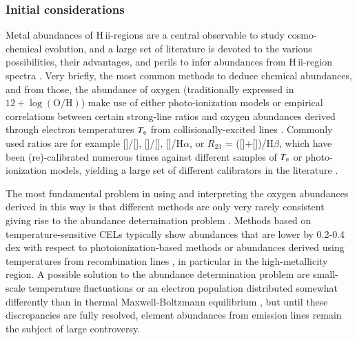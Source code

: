 \documentclass[traditabstract]{aa}
\newcommand{\hb}{H$\beta$}
\newcommand{\ha}{H$\alpha$}
\newcommand{\hii}{\mbox{H\,{\sc ii}}}
\newcommand{\oh}{12+\log(\mathrm{O/H})}
\newcommand{\oii}{[\ion{O}{ii}]}
\newcommand{\oiii}{[\ion{O}{iii}]}
\newcommand{\nii}{[\ion{N}{ii}]}
\begin{document}
\subsubsection{Initial considerations}

Metal abundances of \hii-regions are a central observable to study cosmo-chemical evolution, and a large set of literature is devoted to the various possibilities, their advantages, and perils to infer abundances from \hii-region spectra  \citep[e.g.][]{1979MNRAS.189...95P, 1991ApJ...380..140M, 2005ApJ...631..231P, 2008ApJ...681.1183K}. Very briefly, the most common methods to deduce chemical abundances, and from those, the abundance of oxygen (traditionally expressed in $\oh$) make use of either photo-ionization models \citep[e.g.][]{1985ApJS...58..125E, 2000ApJ...542..224D, 2002ApJS..142...35K} or empirical correlations between certain strong-line ratios and oxygen abundances derived through electron temperatures $T_{\rm{e}}$ from collisionally-excited lines \citep[CELs, e.g.][]{2004MNRAS.348L..59P, 2013A&A...559A.114M}. Commonly used ratios are for example \nii/\oii, \oiii/\nii, \nii/\ha, or $R_{23}$ = (\oii+\oiii)/\hb, which have been (re)-calibrated numerous times against different samples of $T_{\rm{e}}$ or photo-ionization models, yielding a large set of different calibrators in the literature \citep[e.g.][]{2002ApJS..142...35K, 2004ApJ...617..240K, 2005ApJ...631..231P, 2006A&A...459...85N, 2008A&A...488..463M}.

The most fundamental problem in using and interpreting the oxygen abundances derived in this way is that different methods are only very rarely consistent \citep[e.g.][]{2008ApJ...681.1183K} giving rise to the abundance determination problem \citep{1967ApJ...150..825P}. Methods based on temperature-sensitive CELs typically show abundances that are lower by 0.2-0.4 dex with respect to photoionization-based methods or abundances derived using temperatures from recombination lines \citep[e.g.][and references therein]{2012MNRAS.426.2630L}, in particular in the high-metallicity region. A possible solution to the abundance determination problem are small-scale temperature fluctuations \citep[e.g.][]{2003ApJ...584..735P, 2004MNRAS.355..229E} or an electron population distributed somewhat differently than in thermal Maxwell-Boltzmann equilibrium \citep{2012ApJ...752..148N, 2012MNRAS.426.2630L}, but until these discrepancies are fully resolved, element abundances from emission lines remain the subject of large controversy.
\end{document}
